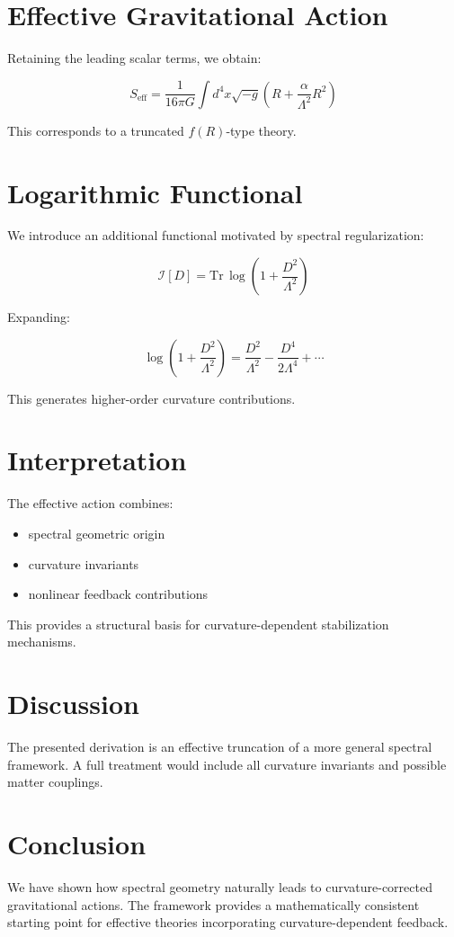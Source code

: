 \documentclass[11pt]{article}
\begin{document}
\section{Effective Gravitational Action}

Retaining the leading scalar terms, we obtain:

\begin{equation}
S_{\mathrm{eff}} =
\frac{1}{16\pi G}
\int d^4x \sqrt{-g}
\left(
R + \frac{\alpha}{\Lambda^2} R^2
\right)
\end{equation}

This corresponds to a truncated $f(R)$-type theory.

\section{Logarithmic Functional}

We introduce an additional functional motivated by spectral regularization:

\begin{equation}
\mathcal{I}[D] =
\mathrm{Tr}\,\log\left(1 + \frac{D^2}{\Lambda^2}\right)
\end{equation}

Expanding:

\begin{equation}
\log\left(1 + \frac{D^2}{\Lambda^2}\right)
=
\frac{D^2}{\Lambda^2}
-
\frac{D^4}{2\Lambda^4}
+
\cdots
\end{equation}

This generates higher-order curvature contributions.

\section{Interpretation}

The effective action combines:

\begin{itemize}
\item spectral geometric origin
\item curvature invariants
\item nonlinear feedback contributions
\end{itemize}

This provides a structural basis for curvature-dependent stabilization mechanisms.

\section{Discussion}

The presented derivation is an effective truncation of a more general spectral framework. A full treatment would include all curvature invariants and possible matter couplings.

\section{Conclusion}

We have shown how spectral geometry naturally leads to curvature-corrected gravitational actions. The framework provides a mathematically consistent starting point for effective theories incorporating curvature-dependent feedback.
\end{document}
